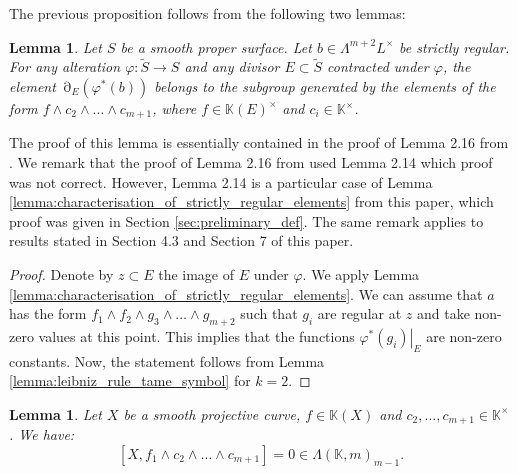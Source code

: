 \documentclass[12pt]{extarticle}
\newtheorem{lemma}[theorem]{Lemma}
\def\mb{\mathbb}
\def\L{\Lambda}
\def\k{\mb K}
\def\ph{\varphi}
\def\t{\times}
\def\wt{\widetilde}
\def\wdw{\wedge\dots\wedge}
\newcommand{\res}[2]{\left.{#1}\right|_{#2}}
\DeclareMathOperator{\ts}{\partial}
\begin{document}
The previous proposition follows from the following two lemmas:

\begin{lemma}
\label{lemma:finitnes_of_sum}
Let $S$ be a smooth proper surface. Let $b\in \Lambda^{m+2} L^\t$ be strictly regular. For any alteration $\ph\colon \wt S\to S$ and any divisor $E\subset \wt S$ contracted under $\ph$, the element $\ts_E(\ph^*(b))$ belongs to the subgroup generated by the elements of the form $f\wedge c_2\wdw c_{m+1}$, where $f\in \k(E)^\times$ and $c_i\in \k^\times$.
\end{lemma}

The proof of this lemma is essentially contained in the proof of Lemma 2.16 from \cite{bolbachan_2023_chow}. We remark that the proof of Lemma 2.16  from \cite{bolbachan_2023_chow} used Lemma 2.14 which proof was not correct. However, Lemma 2.14 is a particular case of Lemma \ref{lemma:characterisation_of_strictly_regular_elements} from this paper, which proof was given  in Section \ref{sec:preliminary_def}. The same remark applies to results stated in Section 4.3 and Section 7 of this paper.

\begin{proof}
    Denote by $z\subset E$ the image of $E$ under $\varphi$. We apply Lemma \ref{lemma:characterisation_of_strictly_regular_elements}. We can assume that $a$ has the form $f_1\wedge f_2\wedge g_3\wdw g_{m+2}$ such that $g_i$ are regular at $z$ and take non-zero values at this point. This implies that the functions $\res{\varphi^*(g_i)}{E}$ are non-zero constants. Now, the statement follows from Lemma \ref{lemma:leibniz_rule_tame_symbol} for $k=2$.
\end{proof}




\begin{lemma}
\label{lemma:Beilinson_Soule_vanishing_weight_zero}
Let $X$ be a smooth projective curve, $f\in\k(X)$ and $c_2,\dots, c_{m+1}\in\k^\t$. We have:
        $$[X, f_1\wedge c_2\wdw c_{m+1}]=0\in \L(\k,m)_{m-1}.$$
\end{lemma}
\end{document}
